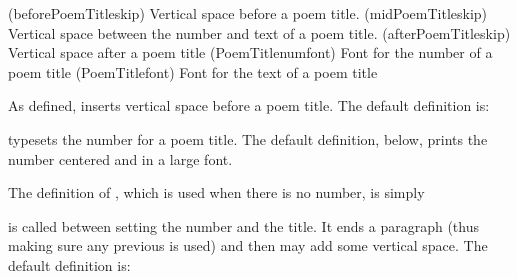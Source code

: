 \begin{syntax}
\lnc{\beforePoemTitleskip} \\
\cmd{\PoemTitlenumfont} \\
\lnc{\midPoemTitleskip} \\
\cmd{\PoemTitlefont} \\
\lnc{\afterPoemTitleskip} \\
\end{syntax}
\glossary(beforePoemTitleskip)%
  {}%
  {Vertical space before a poem title.}
\glossary(midPoemTitleskip)%
  {}%
  {Vertical space between the number and text of a poem title.}
\glossary(afterPoemTitleskip)%
  {}%
  {Vertical space after a poem title}
\glossary(PoemTitlenumfont)%
  {}%
  {Font for the number of a poem title}
\glossary(PoemTitlefont)%
  {}%
  {Font for the text of a poem title}


As defined, \cmd{\PoemTitleheadstart} inserts vertical space 
before a poem title. The default definition is:
\begin{lcode}
\newcommand*{\PoemTitleheadstart}{\vspace{\beforePoemTitleskip}}
\newlength{\beforePoemTitleskip}
  \setlength{\beforePoemTitleskip}{1\onelineskip}
\end{lcode}

\cmd{\printPoemTitlenum} typesets the number for a poem title.
The default definition, below, prints the number centered and in
a large font.
\begin{lcode}
\newcommand*{\printPoemTitlenum}{\PoemTitlenumfont \thepoem}
\newcommand*{\PoemTitlenumfont}{\normalfont\large\centering}
\end{lcode}

The definition of \cmd{\printPoemTitlenonum}, which is used
when there is no number, is simply
\begin{lcode}
\newcommand*{\printPoemTitlenonum}{}
\end{lcode}

\cmd{\afterPoemTitlenum} is called between setting the number 
and the title. It ends a paragraph (thus making sure any previous
\cmd{\centering} is used) and then may add some vertical
space. The default definition is:
\begin{lcode}
\newcommand*{\afterPoemTitlenum}{\par\nobreak\vskip \midPoemTitleskip}
\newlength{\midPoemTitleskip}
  \setlength{\midPoemTitleskip}{0pt}
\end{lcode}

